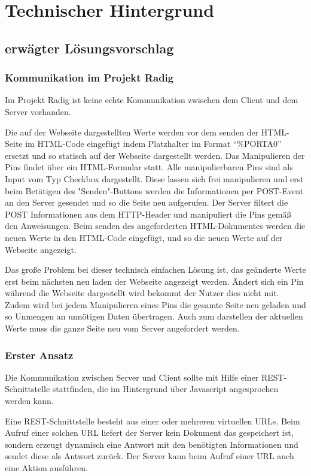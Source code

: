 \chapter{Technischer Hintergrund}

\section{erwägter Lösungsvorschlag}

\subsection{Kommunikation im Projekt Radig}
Im Projekt Radig ist keine echte Kommunikation zwischen dem Client und dem Server 
vorhanden. 

Die auf der Webseite dargestellten Werte werden vor dem senden der HTML-Seite 
im HTML-Code eingefügt indem Platzhalter im Format "`\%PORTA0"' ersetzt und so statisch auf 
der Webseite dargestellt werden. Das Manipulieren der Pins findet über ein HTML-Formular 
statt. Alle manipulierbaren Pins sind als Input vom Typ Checkbox dargestellt. Diese lassen 
sich frei manipulieren und erst beim Betätigen des "Senden"-Buttons werden die 
Informationen per POST-Event an den Server gesendet und so die Seite neu aufgerufen. Der 
Server filtert die POST Informationen aus dem HTTP-Header und manipuliert die Pins gemäß 
den Anweisungen. Beim senden des angeforderten HTML-Dokumentes werden die neuen Werte in 
den HTML-Code eingefügt, und so die neuen Werte auf der Webseite angezeigt.

Das große Problem bei dieser technisch einfachen Lösung ist, das geänderte Werte erst beim 
nächsten neu laden der Webseite angezeigt werden. Ändert sich ein Pin während die Webseite 
dargestellt wird bekommt der Nutzer dies nicht mit. Zudem wird bei jedem Manipulieren 
eines Pins die gesamte Seite neu geladen und so Unmengen an unnötigen Daten übertragen. 
Auch zum darstellen der aktuellen Werte muss die ganze Seite neu vom Server angefordert 
werden.

\subsection{Erster Ansatz}
Die Kommunikation zwischen Server und Client sollte mit Hilfe einer REST-Schnittstelle 
stattfinden, die im Hintergrund über Javascript angesprochen werden kann. 

Eine REST-Schnittstelle besteht aus einer oder mehreren virtuellen URLs. Beim Aufruf einer 
solchen URL liefert der Server kein Dokument das gespeichert ist, sondern erzeugt 
dynamisch eine Antwort mit den benötigten Informationen und sendet diese als Antwort 
zurück. Der Server kann beim Aufruf einer URL auch eine Aktion ausführen.

